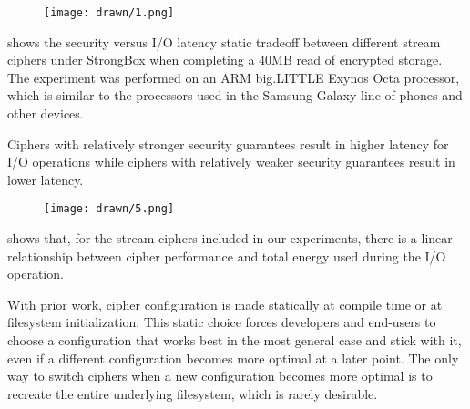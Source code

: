 \begin{figure}[ht]
 \centering
  \texttt{[image: drawn/1.png]}
   \caption{}\label{fig:40mb-read}
\end{figure}

 shows the security versus I/O latency static
tradeoff between different stream ciphers under StrongBox when completing a 40MB
read of encrypted storage. The experiment was performed on an ARM big.LITTLE
Exynos Octa processor, which is similar to the processors used in the Samsung
Galaxy line of phones and other devices. 

Ciphers with relatively stronger security guarantees result in higher latency
for I/O operations while ciphers with relatively weaker security guarantees
result in lower latency.

\begin{figure}[ht]
 \centering
  \texttt{[image: drawn/5.png]}
   \caption{}\label{fig:energy-latency-linearity}
\end{figure}

 shows that, for the stream ciphers included in
our experiments, there is a linear relationship between cipher performance and
total energy used during the I/O operation.

With prior work,  cipher configuration is made
statically at compile time or at filesystem initialization. This static choice forces
developers and end-users to choose a configuration that works best in the most
general case and stick with it, even if a different configuration becomes more
optimal at a later point. The only way to switch ciphers when a new
configuration becomes more optimal is to recreate the entire underlying
filesystem, which is rarely desirable.  


